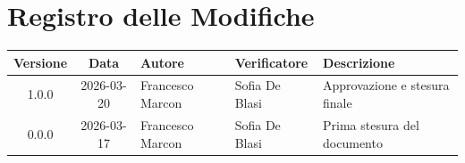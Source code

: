 \section*{Registro delle Modifiche}
\begin{table}[ht]
	\centering
	\renewcommand{\arraystretch}{1.5}
	\begin{tabularx}{\textwidth}{c c l l X}
		\toprule
		\textbf{Versione} & \textbf{Data} & \textbf{Autore} & \textbf{Verificatore} & \textbf{Descrizione} \\
		\midrule
		1.0.0 & 2026-03-20 & Francesco Marcon & Sofia De Blasi & Approvazione e stesura finale \\
		0.0.0 & 2026-03-17 & Francesco Marcon & Sofia De Blasi & Prima stesura del documento \\
		\bottomrule
	\end{tabularx}
\end{table}